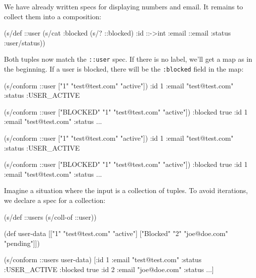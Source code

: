 We have already written specs for displaying numbers and email. It remains to collect them into a composition:

\begin{english}
  \begin{clojure}
(s/def ::user
  (s/cat :blocked (s/? ::blocked)
         :id ::->int
         :email ::email
         :status :user/status))
  \end{clojure}
\end{english}

Both tuples now match the \verb|::user| spec. If there is no label, we'll get a map as in the beginning. If a user is blocked, there will be the  \verb|:blocked| field in the map:

\ifx\DEVICETYPE\MOBILE

\begin{english}
  \begin{clojure}
(s/conform ::user
  ["1" "test@test.com" "active"])
{:id 1
 :email "test@test.com"
 :status :USER_ACTIVE}

(s/conform ::user
  ["BLOCKED" "1"
   "test@test.com" "active"])
{:blocked true
 :id 1
 :email "test@test.com"
 :status ...}
  \end{clojure}
\end{english}

\else

\begin{english}
  \begin{clojure}
(s/conform ::user ["1" "test@test.com" "active"])
{:id 1 :email "test@test.com" :status :USER_ACTIVE}

(s/conform ::user ["BLOCKED" "1" "test@test.com" "active"])
{:blocked true :id 1 :email "test@test.com" :status ...}
  \end{clojure}
\end{english}

\fi

Imagine a situation where the input is a collection of tuples. To avoid iterations, we declare a spec for a collection:

\ifx\DEVICETYPE\MOBILE

\begin{english}
  \begin{clojure}
(s/def ::users (s/coll-of ::user))

(def user-data
  [["1" "test@test.com" "active"]
   ["Blocked" "2" "joe@doe.com"
    "pending"]])

(s/conform ::users user-data)
[{:id 1
  :email "test@test.com"
  :status :USER_ACTIVE}
 {:blocked true
  :id 2
  :email "joe@doe.com"
  :status ...}]
  \end{clojure}
\end{english}


